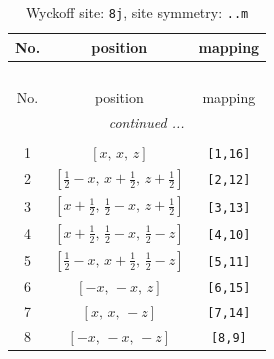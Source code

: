 \documentclass[fleqn,8pt]{jsarticle}
\begin{document}
\begin{longtable}{ccc}
\caption{Wyckoff site: {\tt 8j}, site symmetry: {\tt ..m}}
 \\
 \hline \hline
No. & position & mapping \\ \hline \endfirsthead

\multicolumn{2}{l}{\tablename\ \thetable{}} \\
 \hline \hline
No. & position & mapping \\ \hline \endhead

 \hline \hline
\multicolumn{2}{r}{\footnotesize\it continued ...} \\ \endfoot

 \hline \hline
\multicolumn{2}{r}{} \\ \endlastfoot

1 & $\left[ x,\, x,\, z \right]$ & {\tt [1,16]} \\ \hline
2 & $\left[ \frac{1}{2} - x,\, x + \frac{1}{2},\, z + \frac{1}{2} \right]$ & {\tt [2,12]} \\ \hline
3 & $\left[ x + \frac{1}{2},\, \frac{1}{2} - x,\, z + \frac{1}{2} \right]$ & {\tt [3,13]} \\ \hline
4 & $\left[ x + \frac{1}{2},\, \frac{1}{2} - x,\, \frac{1}{2} - z \right]$ & {\tt [4,10]} \\ \hline
5 & $\left[ \frac{1}{2} - x,\, x + \frac{1}{2},\, \frac{1}{2} - z \right]$ & {\tt [5,11]} \\ \hline
6 & $\left[ - x,\, - x,\, z \right]$ & {\tt [6,15]} \\ \hline
7 & $\left[ x,\, x,\, - z \right]$ & {\tt [7,14]} \\ \hline
8 & $\left[ - x,\, - x,\, - z \right]$ & {\tt [8,9]} \\
\end{longtable}
\renewcommand{\arraystretch}{1.2}
\end{document}
